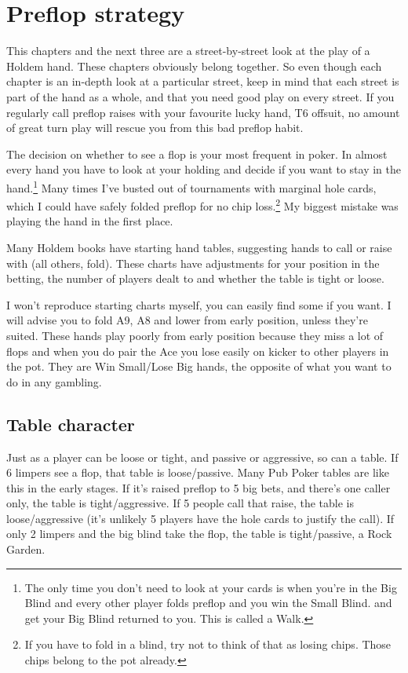 \chapter{Preflop strategy}


This chapters and the next three are a street-by-street look at the
play of a Holdem hand. These chapters obviously belong together. So
even though each chapter is an in-depth look at a particular street,
keep in mind that each street is part of the hand as a whole, and that
you need good play on every street. If you regularly call preflop
raises with your favourite lucky hand, T6 offsuit, no amount of great
turn play will rescue you from this bad preflop habit.

The decision on whether to see a flop is your most
frequent in poker. In almost every hand you have to look at your
holding and decide if you want to stay in the hand.\footnote{The only
time you don't need to look at your cards is when you're in the Big
Blind and every other player folds preflop and you win the Small Blind.
and get your Big Blind returned to you. This is called a Walk.} Many
times I've busted out of tournaments with marginal hole cards, which I
could have safely folded preflop for no chip loss.\footnote{If you
have to fold in a blind, try not to think of that as losing
chips. Those chips belong to the pot already.} My biggest mistake was
playing the hand in the first place.

Many Holdem books have starting hand tables, suggesting
hands to call or raise with (all others, fold). These
charts have adjustments for your position in the betting,
the number of players dealt to and whether the table is tight or loose.

I won't reproduce starting charts myself, you can easily find some
if you want. I will advise you to fold A9, A8 and lower from early
position, unless they're suited. These hands play poorly from
early position because they miss a lot of flops and when you do
pair the Ace you lose easily on kicker to other players in the pot.
They are Win Small/Lose Big hands, the opposite of what you want to do
in any gambling.

\section{Table character}

Just as a player can be loose or tight, and passive or
aggressive, so can a table. If 6 limpers see a flop,
that table is loose/passive. Many Pub Poker tables are like this
in the early stages. If it's raised preflop to
5 big bets, and there's one caller only, the table is
tight/aggressive. If 5 people call that raise, the table
is loose/aggressive (it's unlikely 5 players have the hole
cards to justify the call). If only 2 limpers and the big blind
take the flop, the table is tight/passive, a Rock Garden.

